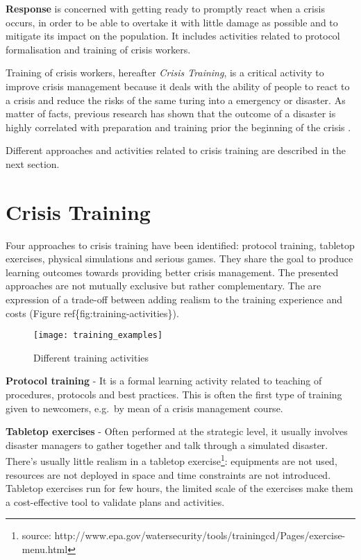 \textbf{Response} is concerned with getting ready to promptly react when a crisis occurs, in order to be able to overtake it with little damage as possible and to mitigate its impact on the population. It includes activities related to protocol formalisation and training of crisis workers.

Training of crisis workers, hereafter \emph{Crisis Training}, is a critical activity to improve crisis management because it deals with the ability of people to react to a crisis and reduce the risks of the same turing into a emergency or disaster. As matter of facts, previous research has shown that the outcome of a disaster is highly correlated with preparation and training prior the beginning of the crisis \autocite{Asproth:cb}.

Different approaches and activities related to crisis training are described in the next section.

\section{Crisis Training}\label{crisis-training}

Four approaches to crisis training have been identified: protocol training, tabletop exercises, physical simulations and serious games. They share the goal to produce learning outcomes towards providing better crisis management. The presented approaches are not mutually exclusive but rather complementary. The are expression of a trade-off between adding realism to the training experience and costs (Figure ref\{fig:training-activities\}).
\begin{figure}
	[h!] \centering 
	\texttt{[image: training\_examples]} \caption{Different training activities} \label{fig:training-activities} 
\end{figure}

\textbf{Protocol training} - It is a formal learning activity related to teaching of procedures, protocols and best practices. This is often the first type of training given to newcomers, e.g.~by mean of a crisis management course.

\textbf{Tabletop exercises} - Often performed at the strategic level, it usually involves disaster managers to gather together and talk through a simulated disaster. There's usually little realism in a tabletop exercise\footnote{source: http://www.epa.gov/watersecurity/tools/trainingcd/Pages/exercise-menu.html}: equipments are not used, resources are not deployed in space and time constraints are not introduced. Tabletop exercises run for few hours, the limited scale of the exercises make them a cost-effective tool to validate plans and activities.

